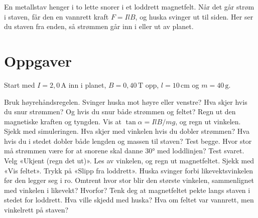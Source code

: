 \documentclass[11pt]{article}
\begin{document}

En metallstav henger i to lette snorer i et loddrett magnetfelt. Når det går strøm i staven, får den en vannrett kraft $F = IlB$, og huska svinger ut til siden. Her ser du staven fra enden, så strømmen går inn i eller ut av planet.

\section*{Oppgaver}

Start med $I = 2{,}0\,\mathrm{A}$ inn i planet, $B = 0{,}40\,\mathrm{T}$ opp, $l = 10\,\mathrm{cm}$ og $m = 40\,\mathrm{g}$.

\begin{oppgaveliste}
\oppgave {}Bruk høyrehåndsregelen. Svinger huska mot høyre eller venstre? Hva skjer hvis du snur strømmen? Og hvis du snur både strømmen og feltet?
\svar
\oppgave {}Regn ut den magnetiske kraften og tyngden. Vis at $\tan  α = IlB / mg$, og regn ut vinkelen. Sjekk med simuleringen.
\svar
\oppgave {}Hva skjer med vinkelen hvis du dobler strømmen? Hva hvis du i stedet dobler både lengden og massen til staven? Test begge.
\svar
\oppgave {}Hvor stor må strømmen være for at snorene skal danne 30° med loddlinjen? Test svaret.
\svar
\oppgave {}Velg «Ukjent (regn det ut)». Les av vinkelen, og regn ut magnetfeltet. Sjekk med «Vis feltet».
\svar
\oppgave {}Trykk på «Slipp fra loddrett». Huska svinger forbi likevektsvinkelen før den legger seg i ro. Omtrent hvor stor blir den største vinkelen, sammenlignet med vinkelen i likevekt? Hvorfor?
\svar
\oppgave {}Tenk deg at magnetfeltet pekte langs staven i stedet for loddrett. Hva ville skjedd med huska? Hva om feltet var vannrett, men vinkelrett på staven?
\svar
\end{oppgaveliste}
\end{document}

